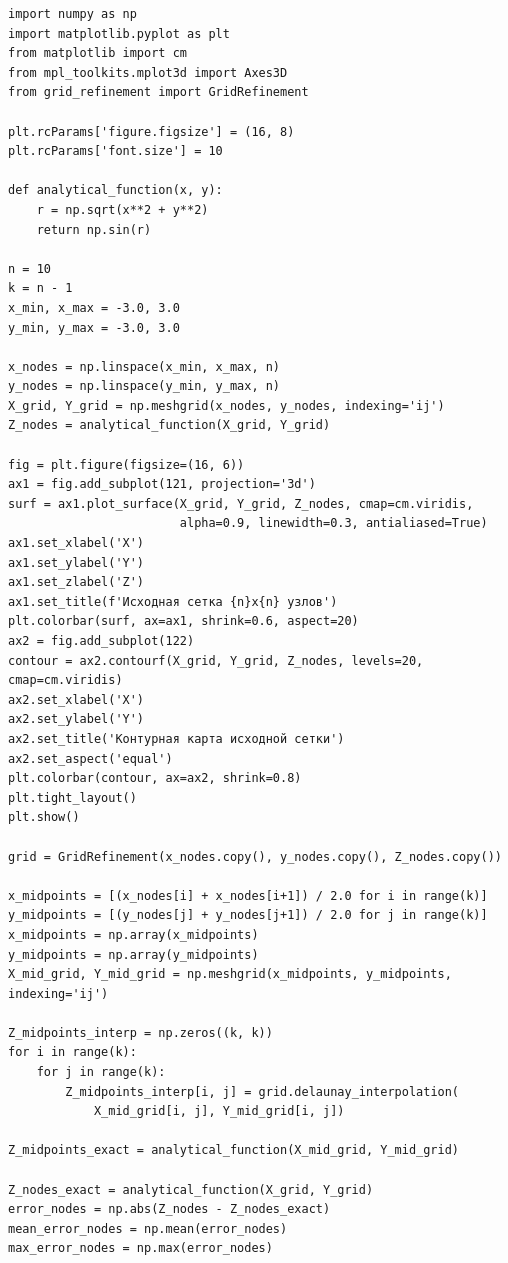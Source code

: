 \documentclass[a4paper, 14pt]{extarticle}
\begin{document}
\begin{longlisting}
\caption{Вычислительный скрипт с визуализацией}
\begin{verbatim}
import numpy as np
import matplotlib.pyplot as plt
from matplotlib import cm
from mpl_toolkits.mplot3d import Axes3D
from grid_refinement import GridRefinement

plt.rcParams['figure.figsize'] = (16, 8)
plt.rcParams['font.size'] = 10

def analytical_function(x, y):
    r = np.sqrt(x**2 + y**2)
    return np.sin(r)

n = 10
k = n - 1
x_min, x_max = -3.0, 3.0
y_min, y_max = -3.0, 3.0

x_nodes = np.linspace(x_min, x_max, n)
y_nodes = np.linspace(y_min, y_max, n)
X_grid, Y_grid = np.meshgrid(x_nodes, y_nodes, indexing='ij')
Z_nodes = analytical_function(X_grid, Y_grid)

fig = plt.figure(figsize=(16, 6))
ax1 = fig.add_subplot(121, projection='3d')
surf = ax1.plot_surface(X_grid, Y_grid, Z_nodes, cmap=cm.viridis,
                        alpha=0.9, linewidth=0.3, antialiased=True)
ax1.set_xlabel('X')
ax1.set_ylabel('Y')
ax1.set_zlabel('Z')
ax1.set_title(f'Исходная сетка {n}x{n} узлов')
plt.colorbar(surf, ax=ax1, shrink=0.6, aspect=20)
ax2 = fig.add_subplot(122)
contour = ax2.contourf(X_grid, Y_grid, Z_nodes, levels=20, cmap=cm.viridis)
ax2.set_xlabel('X')
ax2.set_ylabel('Y')
ax2.set_title('Контурная карта исходной сетки')
ax2.set_aspect('equal')
plt.colorbar(contour, ax=ax2, shrink=0.8)
plt.tight_layout()
plt.show()

grid = GridRefinement(x_nodes.copy(), y_nodes.copy(), Z_nodes.copy())

x_midpoints = [(x_nodes[i] + x_nodes[i+1]) / 2.0 for i in range(k)]
y_midpoints = [(y_nodes[j] + y_nodes[j+1]) / 2.0 for j in range(k)]
x_midpoints = np.array(x_midpoints)
y_midpoints = np.array(y_midpoints)
X_mid_grid, Y_mid_grid = np.meshgrid(x_midpoints, y_midpoints, indexing='ij')

Z_midpoints_interp = np.zeros((k, k))
for i in range(k):
    for j in range(k):
        Z_midpoints_interp[i, j] = grid.delaunay_interpolation(
            X_mid_grid[i, j], Y_mid_grid[i, j])

Z_midpoints_exact = analytical_function(X_mid_grid, Y_mid_grid)

Z_nodes_exact = analytical_function(X_grid, Y_grid)
error_nodes = np.abs(Z_nodes - Z_nodes_exact)
mean_error_nodes = np.mean(error_nodes)
max_error_nodes = np.max(error_nodes)


\end{verbatim}
\end{longlisting}
\end{document}
